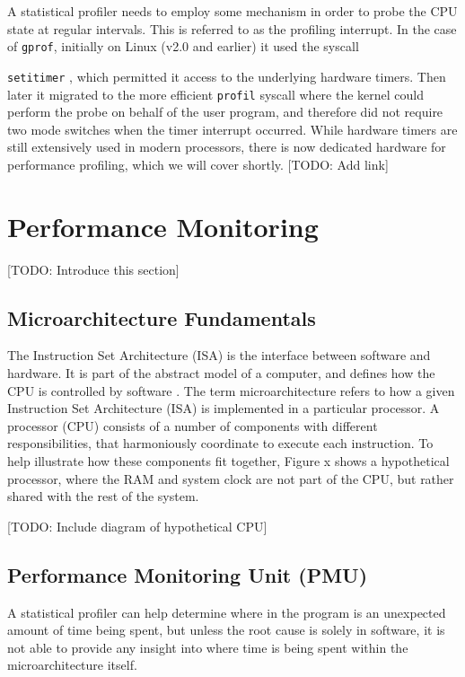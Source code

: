 A statistical profiler needs to employ some mechanism in order to probe the CPU state at regular intervals. This is referred to as the profiling interrupt. In the case of \texttt{gprof}, initially on Linux (v2.0 and earlier) it used the syscall {\texttt{setitimer} \cite{DocsGProfImpl}, which permitted it access to the underlying hardware timers. Then later it migrated to the more efficient \texttt{profil} syscall where the kernel could perform the probe on behalf of the user program, and therefore did not require two mode switches when the timer interrupt occurred. While hardware timers are still extensively used in modern processors, there is now dedicated hardware for performance profiling, which we will cover shortly. [TODO: Add link]

\section{Performance Monitoring}

[TODO: Introduce this section]

\subsection{Microarchitecture Fundamentals}

The Instruction Set Architecture (ISA) is the interface between software and hardware. It is part of the abstract model of a computer, and defines how the CPU is controlled by software \cite{GlossArmISA}. The term microarchitecture refers to how a given Instruction Set Architecture (ISA) is implemented in a particular processor. A processor (CPU) consists of a number of components with different responsibilities, that harmoniously coordinate to execute each instruction. To help illustrate how these components fit together, Figure x shows a hypothetical processor, where the RAM and system clock are not part of the CPU, but rather shared with the rest of the system.

[TODO: Include diagram of hypothetical CPU]

\subsection{Performance Monitoring Unit (PMU)}

A statistical profiler can help determine where in the program is an unexpected amount of time being spent, but unless the root cause is solely in software, it is not able to provide any insight into where time is being spent within the microarchitecture itself.

}
